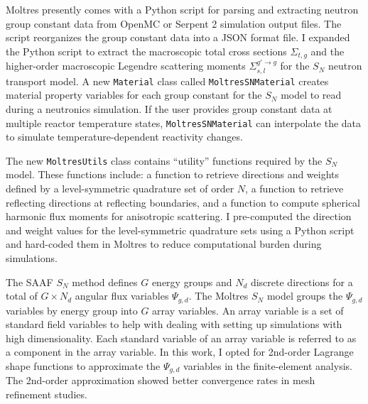 Moltres presently comes with a Python script for parsing and extracting neutron group constant data
from OpenMC \cite{boyd_multigroup_2019} or Serpent 2 \cite{leppanen_serpent_2014} simulation
output files. The script reorganizes the group constant data into a
JSON format file. I expanded the Python script to extract
the macroscopic total cross sections $\Sigma_{t,g}$ and the higher-order macroscopic Legendre
scattering moments $\Sigma^{g'\rightarrow g}_{s,l}$ for the $S_N$ neutron transport model. A new
\texttt{Material} class called \texttt{MoltresSNMaterial} creates material
property variables for each group constant for the $S_N$ model to read during a neutronics
simulation. If the user provides group constant data at multiple reactor temperature states,
\texttt{MoltresSNMaterial} can interpolate the data to simulate temperature-dependent reactivity
changes.

The new \texttt{MoltresUtils} class contains ``utility'' functions required by the $S_N$ model.
These functions include: a function to retrieve directions and weights defined by a
level-symmetric quadrature set of order $N$, a function to retrieve reflecting directions at
reflecting boundaries, and a function to compute spherical harmonic flux moments for anisotropic
scattering. I pre-computed the direction and weight values for the level-symmetric quadrature sets
using a Python script and hard-coded them in Moltres to reduce computational burden during
simulations.

The \gls{SAAF} $S_N$ method defines $G$ energy groups and $N_d$ discrete directions for a total
of $G\times N_d$ angular flux variables $\Psi_{g,d}$. The Moltres $S_N$ model groups the
$\Psi_{g,d}$ variables by energy group into $G$ array variables. An array variable is a
set of standard field variables to help with dealing with setting up simulations with high
dimensionality. Each standard variable of an array variable is referred to as a component in the
array variable. In this work, I opted for
2nd-order Lagrange shape functions to approximate the $\Psi_{g,d}$ variables in the finite-element
analysis. The 2nd-order approximation showed better convergence rates in mesh refinement studies.

